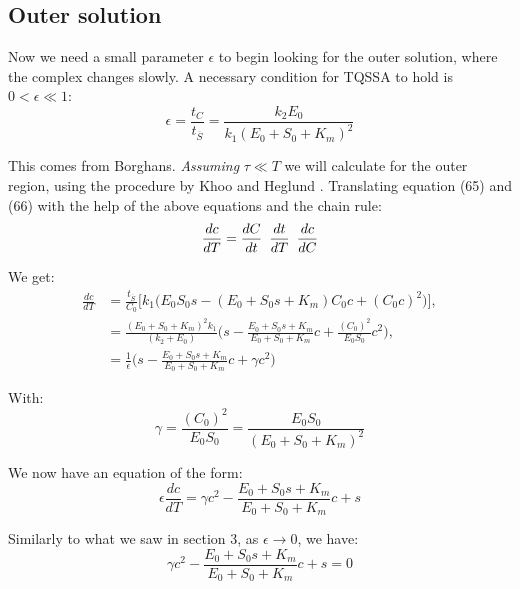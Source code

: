 \documentclass[12pt]{article}
\begin{document}
\subsection{Outer solution}

Now we need a small parameter $\epsilon$ to begin looking for the
outer solution, where the complex changes slowly. A necessary
condition for TQSSA to hold is $0 < \epsilon \ll 1$:
\begin{equation}
\epsilon = \frac{t_C}{t_{\overline{S}}} = \frac{k_2 E_0}{k_1(E_0+S_0+K_m)^2}
\end{equation}

This comes from Borghans. \textit{Assuming} $\tau \ll T$ we will calculate for the outer region, using the procedure by Khoo and Heglund \cite{khoo2008total}. Translating equation (65) and (66) with the help of the above equations and the chain rule:
\begin{equation}
\frac{dc}{dT} = \frac{dC}{dt} \enskip \frac{dt}{dT} \enskip \frac{dc}{dC}
\end{equation}

We get:
\begin{align}
\frac{dc}{dT} &= \frac{t_{\overline{S}}}{C_0}
       \Big[k_1 \Big(E_0 S_0 s - (E_0 + S_0 s + K_m) C_0 c + (C_0 c)^2
                   \Big)\Big], \\
              &= \frac{(E_0+S_0+K_m)^2 k_1}{(k_2 + E_0)}
                 \Big(s - \frac{E_0+S_0 s+K_m}{E_0 + S_0 + K_m} c
                        + \frac{(C_0)^2}{E_0 S_0} c^2 \Big), \\
              &= \frac{1}{\epsilon}
                 \Big(s - \frac{E_0+S_0 s+K_m}{E_0 + S_0 + K_m} c
                        +  \gamma c^2 \Big)
\end{align}

With:
\begin{equation}
\gamma = \frac{(C_0)^2}{E_0 S_0} = \frac{E_0 S_0}{(E_0 + S_0 + K_m)^2}
\end{equation}

We now have an equation of the form:
\begin{equation}
  \epsilon \frac{dc}{dT} = \gamma c^2 - \frac{E_0+S_0 s+K_m}{E_0 + S_0 + K_m} c + s
\end{equation}

Similarly to what we saw in section 3, as $\epsilon \to 0$, we have:
\begin{equation}
   \gamma c^2  - \frac{E_0+S_0 s+K_m}{E_0 + S_0 + K_m} c + s = 0
\end{equation}
\end{document}
